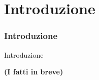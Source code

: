 %

\section{Introduzione}
\begin{frame}[fragile]
        \frametitle{Introduzione}

        \begin{center}\huge{Introduzione}\end{center}
        \begin{center}\huge{\color{typo3darkgrey}\textbf{(I fatti in breve)}}\end{center}

\end{frame}



